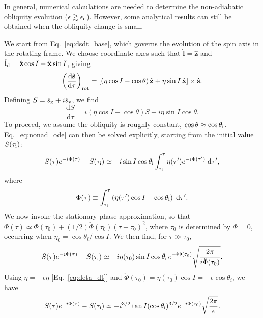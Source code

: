\documentclass[twocolumn,twocolappendix]{aastex63}
\newcommand*{\rd}[2]{\frac{\mathrm{d}#1}{\mathrm{d}#2}}
\newcommand*{\bsmb}[1]{\boldsymbol{\mathbf{#1}}}
\newcommand*{\uv}[1]{\hat{\bsmb{#1}}}
\newcommand*{\p}[1]{\left(#1\right)}
\newcommand*{\s}[1]{\left[#1\right]}
\begin{document}
In general, numerical calculations are needed to determine the non-adiabatic
obliquity evolution ($\epsilon\gtrsim \epsilon_{\rm c}$). However, some
analytical results can still be obtained when the obliquity change is small.

We start from Eq.~\eqref{eq:dsdt_base}, which governs the evolution of the spin
axis in the rotating frame. We choose coordinate axes such that $\uv{l} =
\uv{z}$ and $ \uv{l}_{\rm d} = \uv{z} \cos I + \uv{x}\sin I$, giving
\begin{equation}
    \p{\rd{\uv{s}}{\tau}}_{\rm rot} = \s{
        \p{\eta \cos I - \cos \theta}\uv{z}
            + \eta \sin I \,\uv{x}} \times \uv{s}.
\end{equation}
Defining $S = {\hat s}_{\rm x} + i{\hat s}_{\rm y}$, we find
\begin{equation}
    \rd{S}{\tau} = i\p{\eta\cos I - \cos \theta}S
        - i \eta \sin I\cos\theta.\label{eq:nonad_ode}
\end{equation}
To proceed, we assume the obliquity is roughly constant, $\cos \theta \approx
\cos \theta_{\rm i}$. Eq.~\eqref{eq:nonad_ode} can then be solved explicitly,
starting from the initial value $S(\tau_{\rm i})$:
\begin{equation}
    S(\tau)e^{-i\Phi(\tau)} - S(\tau_{\rm i})
        \simeq -i\sin I \cos \theta_{\rm i}
            \int_{\tau_{\rm i}}^\tau \eta(\tau')
            e^{-i\Phi(\tau')}\;\mathrm{d}\tau',
\end{equation}
where
\begin{equation}
    \Phi(\tau) \equiv \int_{\tau_{\rm i}}^\tau \p{\eta(\tau') \cos I
        - \cos \theta_{\rm i}}\; \mathrm{d}\tau'.
\end{equation}
We now invoke the stationary phase approximation, so that $\Phi(\tau)\simeq
\Phi(\tau_0) + (1/2)\ddot\Phi (\tau_0)(\tau - \tau_0)^2$, where $\tau_0$ is
determined by $\dot\Phi = 0$, occurring when $\eta_0 = \cos \theta_i /\cos I$.
We then find, for $\tau \gg \tau_0$,
\begin{equation}
    S(\tau)e^{-i\Phi(\tau)} - S(\tau_{\rm i})
        \simeq -i \eta(\tau_0)\sin I \cos \theta_{\rm i}\,e^{-i\Phi(\tau_0)}
            \sqrt{\frac{2\pi}{i \ddot\Phi(\tau_0)}}.
\end{equation}
Using $\dot\eta = -\epsilon \eta$ [Eq.~\eqref{eq:deta_dt}] and
$\ddot\Phi(\tau_0) = \dot\eta(\tau_0)\cos I = -\epsilon \cos\theta_i$,
we have
\begin{equation}
  S(\tau)e^{-i\Phi(\tau)} - S(\tau_{\rm i})
        \simeq -i^{3/2}\tan I (\cos\theta_{\rm i})^{3/2} e^{-i\Phi(\tau_0)}
            \sqrt{\frac{2\pi}{\epsilon}}.
\end{equation}
\end{document}
